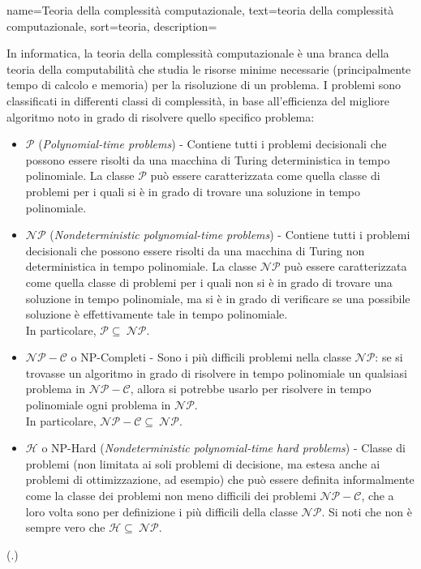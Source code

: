 {
    name=Teoria della complessità computazionale,
    text=teoria della complessità computazionale,
    sort=teoria,
    description={In informatica, la teoria della complessità computazionale è una branca della teoria della computabilità che studia le risorse minime necessarie (principalmente tempo di calcolo e memoria) per la risoluzione di un problema. I problemi sono classificati in differenti classi di complessità, in base all'efficienza del migliore algoritmo noto in grado di risolvere quello specifico problema:
    \begin{itemize}
        \item $\mathcal{P}$ (\textit{Polynomial-time problems}) - Contiene tutti i problemi decisionali che possono essere risolti da una macchina di Turing deterministica in tempo polinomiale. La classe $\mathcal{P}$ può essere caratterizzata come quella classe di problemi per i quali si è in grado di trovare una soluzione in tempo polinomiale.
        \item $\mathcal{NP}$ (\textit{Nondeterministic polynomial-time problems}) - Contiene tutti i problemi decisionali che possono essere risolti da una macchina di Turing non deterministica in tempo polinomiale. La classe $\mathcal{NP}$ può essere caratterizzata come quella classe di problemi per i quali non si è in grado di trovare una soluzione in tempo polinomiale, ma si è in grado di verificare se una possibile soluzione è effettivamente tale in tempo polinomiale. \\ In particolare, $\mathcal{P} \subseteq\ \mathcal{NP}$.
        \item $\mathcal{NP-C}$ o NP-Completi - Sono i più difficili problemi nella classe $\mathcal{NP}$: se si trovasse un algoritmo in grado di risolvere in tempo polinomiale un qualsiasi problema in $\mathcal{NP-C}$, allora si potrebbe usarlo per risolvere in tempo polinomiale ogni problema in $\mathcal{NP}$. \\ In particolare, $\mathcal{NP-C} \subseteq\ \mathcal{NP}$.
        \item $\mathcal{H}$ o NP-Hard (\textit{Nondeterministic polynomial-time hard problems}) -  Classe di problemi (non limitata ai soli problemi di decisione, ma estesa anche ai problemi di ottimizzazione, ad esempio) che può essere definita informalmente come la classe dei problemi non meno difficili dei problemi $\mathcal{NP-C}$, che a loro volta sono per definizione i più difficili della classe $\mathcal{NP}$. Si noti che non è sempre vero che $\mathcal{H} \subseteq\ \mathcal{NP}$.
    \end{itemize}
    (\cite{wiki:teoria-compl}.)
    }
}


